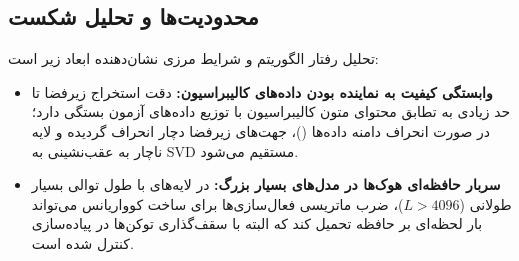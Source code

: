 \subsection{محدودیت‌ها و تحلیل شکست}
تحلیل رفتار الگوریتم و شرایط مرزی نشان‌دهنده ابعاد زیر است:
\begin{itemize}
    \item \textbf{وابستگی کیفیت به نماینده بودن داده‌های کالیبراسیون:} دقت استخراج زیرفضا تا حد زیادی به تطابق محتوای متون کالیبراسیون با توزیع داده‌های آزمون بستگی دارد؛ در صورت انحراف دامنه داده‌ها ()، جهت‌های زیرفضا دچار انحراف گردیده و لایه ناچار به عقب‌نشینی به SVD مستقیم می‌شود.
    \item \textbf{سربار حافظه‌ای هوک‌ها در مدل‌های بسیار بزرگ:} در لایه‌های با طول توالی بسیار طولانی ($L > 4096$)، ضرب ماتریسی فعال‌سازی‌ها برای ساخت کوواریانس می‌تواند بار لحظه‌ای بر حافظه تحمیل کند که البته با سقف‌گذاری توکن‌ها در پیاده‌سازی کنترل شده است.
\end{itemize}
